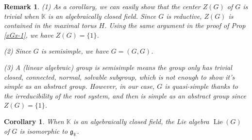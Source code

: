 \documentclass[12pt]{amsart}
\newtheorem{corollary}[theorem]{Corollary}
\newtheorem{remark}[theorem]{Remark}
\begin{document}
\begin{remark}
    (1) As a corollary, we can easily show that the center $Z(G)$ of $G$ is trivial when $\mathbb{K}$ is an algebraically closed field.
    Since $G$ is reductive, $Z(G)$ is contained in the maximal torus $H$. 
    Using the same argument in the proof of Prop \ref{xGx-1}, we have $Z(G)=\{1\}$.

    (2) Since $G$ is semisimple, we have $G=(G,G)$.

    (3) A (linear algebraic) group is semisimple means the group only has trivial closed, connected, normal, solvable subgroup, which is not enough to show it's simple as an abstract group.
    However, in our case, $G$ is quasi-simple thanks to the irreducibility of the root system, and then is simple as an abstract group since $Z(G)=\{1\}$.
\end{remark}

\begin{corollary}
    When $\mathbb{K}$ is an algebraically closed field, the Lie algebra $\operatorname{Lie}(G)$ of $G$ is isomorphic to $\mathfrak{g}_{\mathbb{K}}$.
\end{corollary}
\end{document}
